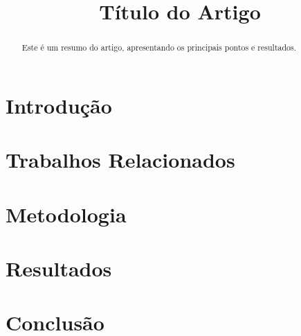 \documentclass[conference]{ieee-template}
\title{Título do Artigo}
\author{\IEEEauthorblockN{Nome do Autor}
\IEEEauthorblockA{Instituição\\
Email: autor@exemplo.com}
}
\begin{document}
\maketitle

\begin{abstract}
Este é um resumo do artigo, apresentando os principais pontos e resultados.
\end{abstract}

\section{Introdução}


\section{Trabalhos Relacionados}


\section{Metodologia}


\section{Resultados}


\section{Conclusão}




\end{document}
